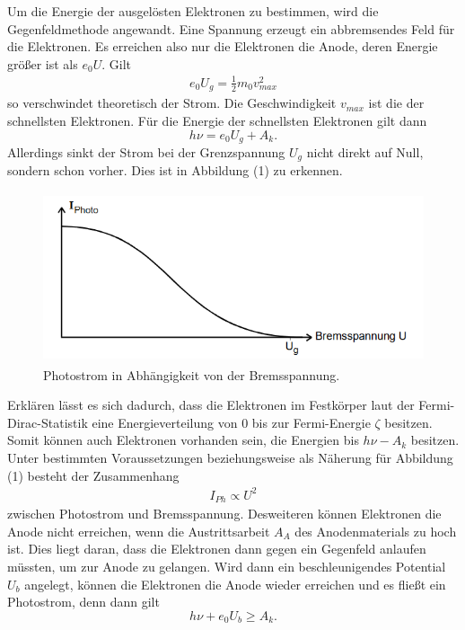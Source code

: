 Um die Energie der ausgelösten Elektronen zu bestimmen, wird die Gegenfeldmethode angewandt.
Eine Spannung erzeugt ein abbremsendes Feld für die Elektronen. Es erreichen also nur die Elektronen die Anode, deren Energie größer ist als $e_0 U$.
Gilt
\begin{align}
  e_0 U_g = \frac{1}{2} m_0 v_{max}^2
\end{align}
so verschwindet theoretisch der Strom. Die Geschwindigkeit $v_{max}$ ist die der schnellsten Elektronen.
Für die Energie der schnellsten Elektronen gilt dann
\begin{equation}
  h \nu = e_0 U_g  + A_k .
\end{equation}
Allerdings sinkt der Strom bei der Grenzspannung $U_g$ nicht direkt auf Null, sondern schon vorher. Dies ist in Abbildung (1) zu erkennen. 
\begin{figure}[H]
  \centering
  \includegraphics[height=5cm]{strom.PNG}
  \caption{Photostrom in Abhängigkeit von der Bremsspannung. \cite{kent}}
  \label{fig:kathode}
\end{figure}
Erklären lässt es sich dadurch, dass die Elektronen im Festkörper laut der Fermi-Dirac-Statistik eine Energieverteilung von $0$ bis zur Fermi-Energie $\zeta$ besitzen. Somit können auch Elektronen vorhanden sein, die Energien bis $h \nu - A_k$ besitzen. 
Unter bestimmten Voraussetzungen beziehungsweise als Näherung für Abbildung (1) besteht der Zusammenhang
\begin{align*}
  I_{Ph} \propto U^2
\end{align*}
zwischen Photostrom und Bremsspannung.
Desweiteren können Elektronen die Anode nicht erreichen, wenn die Austrittsarbeit $A_A$ des Anodenmaterials zu hoch ist. Dies liegt daran, dass die Elektronen dann gegen ein Gegenfeld anlaufen müssten, um zur Anode zu gelangen. Wird dann ein beschleunigendes Potential $U_b$ angelegt, können die Elektronen die Anode wieder erreichen und es fließt ein Photostrom, denn dann gilt
\begin{equation}
  h \nu + e_0 U_b  \geq  A_k .
\end{equation}





